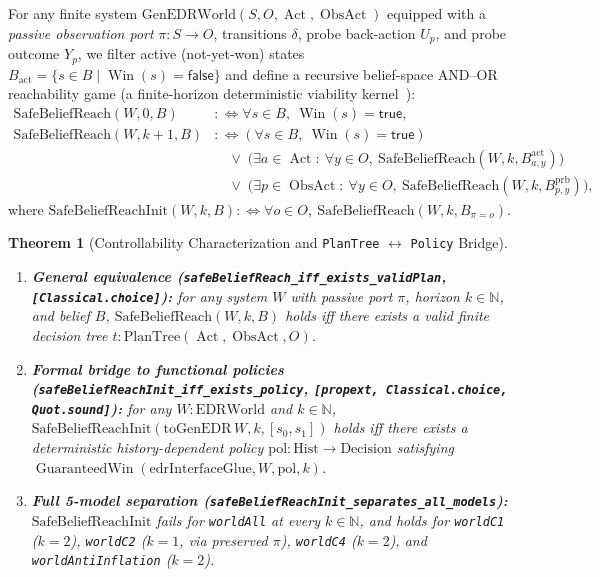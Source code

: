 \documentclass[10pt,a4paper]{article}
\theoremstyle{cleanthm}
\newtheorem{theorem}{Theorem}[section]
\theoremstyle{cleandef}
\DeclareMathOperator{\Win}{Win}
\DeclareMathOperator{\Act}{Act}
\DeclareMathOperator{\ObsAct}{ObsAct}
\DeclareMathOperator{\GuaranteedWin}{GuaranteedWin}
\begin{document}
For any finite system $\mathrm{GenEDRWorld}(S,O,\Act,\ObsAct)$ equipped with a \emph{passive observation port} $\pi:S\to O$, transitions $\delta$, probe back-action $U_p$, and probe outcome $Y_p$, we filter active (not-yet-won) states $B_{\mathrm{act}}=\{s\in B\mid\Win(s)=\mathsf{false}\}$ and define a recursive belief-space AND--OR reachability game (a finite-horizon deterministic viability kernel~\cite{aubin1991,bonet2000}):
\begin{align}
  \mathrm{SafeBeliefReach}(W,0,B) &:\iff \forall s\in B,\ \Win(s)=\mathsf{true}, \\
  \mathrm{SafeBeliefReach}(W,k+1,B) &:\iff (\forall s\in B,\ \Win(s)=\mathsf{true}) \nonumber\\
  &\quad\lor\; \bigl(\exists a\in\Act:\ \forall y\in O,\ \mathrm{SafeBeliefReach}(W,k,B_{a,y}^{\mathrm{act}})\bigr) \nonumber\\
  &\quad\lor\; \bigl(\exists p\in\ObsAct:\ \forall y\in O,\ \mathrm{SafeBeliefReach}(W,k,B_{p,y}^{\mathrm{prb}})\bigr),
\end{align}
where $\mathrm{SafeBeliefReachInit}(W,k,B):\iff\forall o\in O,\ \mathrm{SafeBeliefReach}(W,k,B_{\pi=o})$.

\begin{theorem}[Controllability Characterization and \texttt{PlanTree} $\leftrightarrow$ \texttt{Policy} Bridge]
\label{thm:sbr}
\begin{enumerate}
  \item \textbf{General equivalence (\texttt{safeBeliefReach\_\allowbreak iff\_\allowbreak exists\_\allowbreak validPlan}, \texttt{[Classical.choice]}):} for any system $W$ with passive port $\pi$, horizon $k\in\mathbb{N}$, and belief $B$, $\mathrm{SafeBeliefReach}(W,k,B)$ holds iff there exists a valid finite decision tree $t:\mathrm{PlanTree}(\Act,\ObsAct,O)$.
  \item \textbf{Formal bridge to functional policies (\texttt{safeBeliefReachInit\_\allowbreak iff\_\allowbreak exists\_\allowbreak policy}, \texttt{[propext, Classical.choice, Quot.sound]}):} for any $W:\mathrm{EDRWorld}$ and $k\in\mathbb{N}$, $\mathrm{SafeBeliefReachInit}(\allowbreak\mathrm{toGenEDR}\,W,\allowbreak k,\allowbreak [s_0,s_1])$ holds iff there exists a deterministic history-dependent policy $\mathrm{pol}:\mathrm{Hist}\to\mathrm{Decision}$ satisfying $\GuaranteedWin(\allowbreak\mathrm{edrInterfaceGlue},\allowbreak W,\allowbreak \mathrm{pol},\allowbreak k)$.
  \item \textbf{Full 5-model separation (\texttt{safeBeliefReachInit\_\allowbreak separates\_\allowbreak all\_\allowbreak models}):} $\mathrm{SafeBeliefReachInit}$ fails for \texttt{worldAll} at every $k\in\mathbb{N}$, and holds for \texttt{worldC1} ($k=2$), \texttt{worldC2} ($k=1$, via preserved $\pi$), \texttt{worldC4} ($k=2$), and \texttt{worldAntiInflation} ($k=2$).
\end{enumerate}
\end{theorem}
\end{document}
